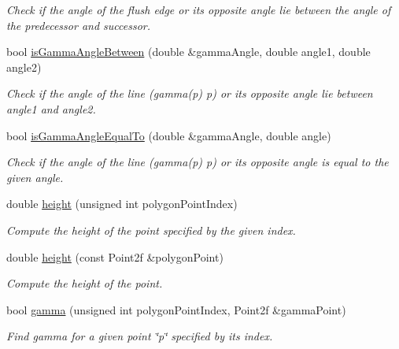 \begin{DoxyCompactItemize}
\begin{DoxyCompactList}\small\item\em Check if the angle of the flush edge or its opposite angle lie between the angle of the predecessor and successor. \end{DoxyCompactList}\item 
bool \hyperlink{classmultiscale_1_1MinEnclosingTriangleFinder_a98d91069c4e7fae9f68f0af8be5e5487}{is\-Gamma\-Angle\-Between} (double \&gamma\-Angle, double angle1, double angle2)
\begin{DoxyCompactList}\small\item\em Check if the angle of the line (gamma(p) p) or its opposite angle lie between angle1 and angle2. \end{DoxyCompactList}\item 
bool \hyperlink{classmultiscale_1_1MinEnclosingTriangleFinder_a3690d470807b2d5d893988370099f283}{is\-Gamma\-Angle\-Equal\-To} (double \&gamma\-Angle, double angle)
\begin{DoxyCompactList}\small\item\em Check if the angle of the line (gamma(p) p) or its opposite angle is equal to the given angle. \end{DoxyCompactList}\item 
double \hyperlink{classmultiscale_1_1MinEnclosingTriangleFinder_a4fd0fdc0ccc472a2d15c8d001f65d0f9}{height} (unsigned int polygon\-Point\-Index)
\begin{DoxyCompactList}\small\item\em Compute the height of the point specified by the given index. \end{DoxyCompactList}\item 
double \hyperlink{classmultiscale_1_1MinEnclosingTriangleFinder_a9507a3196dd16613bf828d04f196b9db}{height} (const Point2f \&polygon\-Point)
\begin{DoxyCompactList}\small\item\em Compute the height of the point. \end{DoxyCompactList}\item 
bool \hyperlink{classmultiscale_1_1MinEnclosingTriangleFinder_a800413be1e1567d986a92fac4a6b937e}{gamma} (unsigned int polygon\-Point\-Index, Point2f \&gamma\-Point)
\begin{DoxyCompactList}\small\item\em Find gamma for a given point \char`\"{}p\char`\"{} specified by its index. \end{DoxyCompactList}\item 

\end{DoxyCompactItemize}
